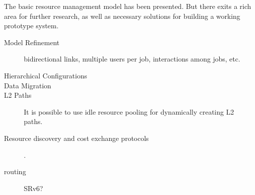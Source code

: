 
The basic resource management model has been presented.
But there exits a rich area for further research, as well as 
necessary solutions for building a working prototype system.

\begin{description}

\item[Model Refinement]  bidirectional links, multiple users per job,
  interactions among jobs, etc.
  
\item[Hierarchical Configurations]

\item[Data Migration]

\item[L2 Paths] It is possible to use idle resource pooling for dynamically
  creating L2 paths.

\item[Resource discovery and cost exchange protocols]
\cite{Albrecht2008}.
  
\item[routing] SRv6?
  
\end{description}
